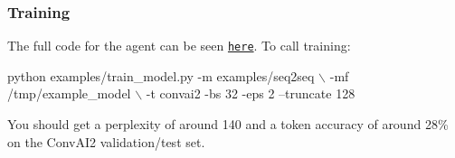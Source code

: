 \subsubsection*{Training}

The full code for the agent can be seen \href{https://github.com/facebookresearch/ParlAI/tree/master/parlai/agents/examples/seq2seq.py}{\tt here}. To call training\+:


\begin{DoxyCode}
python examples/train\_model.py -m examples/seq2seq \(\backslash\)
    -mf /tmp/example\_model \(\backslash\)
    -t convai2 -bs 32 -eps 2 --truncate 128
\end{DoxyCode}


You should get a perplexity of around 140 and a token accuracy of around 28\% on the Conv\+A\+I2 validation/test set. 